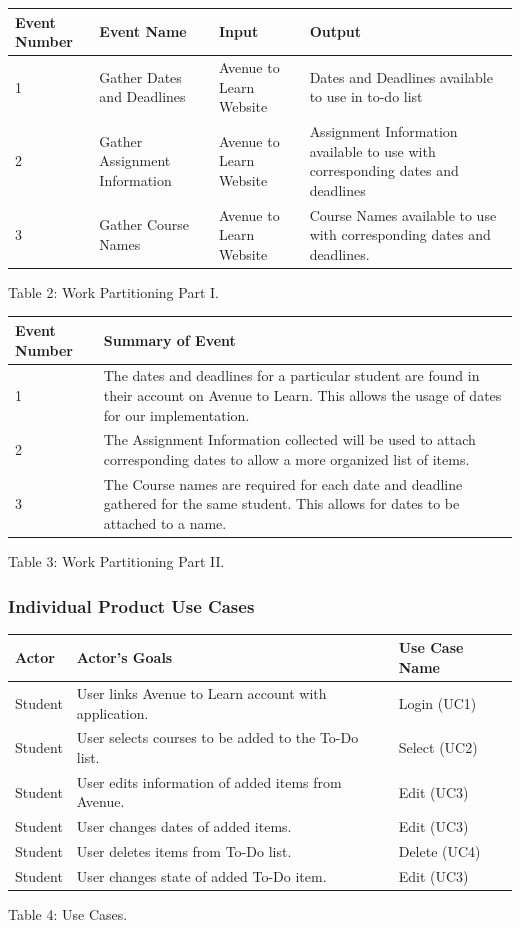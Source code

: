 \documentclass[12pt, titlepage]{article}
\begin{document}
\begin{center}
\begin{tabular}{ |m{4em}|m{8em}|m{10em}|m{10em}| } 
 \hline
 Event Number & Event Name & Input & Output \\ 
 \hline
 1 & Gather Dates and Deadlines & Avenue to Learn Website & Dates and Deadlines available to use in to-do list \\
 \hline
 2 & Gather Assignment Information & Avenue to Learn Website & Assignment Information available to use with corresponding dates and deadlines\\ 
 \hline
 3 & Gather Course Names & Avenue to Learn Website & Course Names available to use with corresponding dates and deadlines.\\
 \hline 
\end{tabular}
Table 2: Work Partitioning Part I.
\end{center}

\begin{center}
\begin{tabular}{ |m{4em}|m{28em}| } 
 \hline
 Event Number & Summary of Event \\ 
 \hline
 1 & The dates and deadlines for a particular student are found in their account on Avenue to Learn. This allows the usage of dates for our implementation. \\
 \hline
 2 & The Assignment Information collected will be used to attach corresponding dates to allow a more organized list of items.\\ 
 \hline
 3 & The Course names are required for each date and deadline gathered for the same student. This allows for dates to be attached to a name. \\
 \hline 
\end{tabular}
Table 3: Work Partitioning Part II.
\end{center}

\subsubsection{Individual Product Use Cases}

\begin{center}
\begin{tabular}{ |m{4em}|m{18em}|m{8em}|} 
 \hline
 Actor & Actor’s Goals & Use Case Name \\ 
 \hline
 Student & User links Avenue to Learn account with application. & Login (UC1) \\
 \hline
 Student & User selects courses to be added to the To-Do list. & Select (UC2) \\ 
 \hline
 Student & User edits information of added items from Avenue. & Edit (UC3) \\
 \hline 
 Student & User changes dates of added items. & Edit (UC3) \\
 \hline 
 Student & User deletes items from To-Do list. & Delete (UC4) \\
 \hline 
 Student & User changes state of added To-Do item. & Edit (UC3) \\
 \hline 
\end{tabular}
Table 4: Use Cases.
\end{center}
\end{document}
